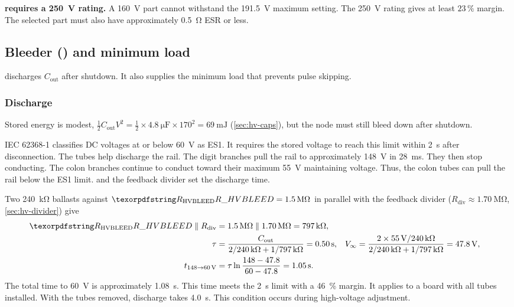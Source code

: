 \textbf{ requires a \SI{250}{\volt} rating.} A
\SI{160}{\volt} part cannot withstand the \SI{191.5}{\volt} maximum setting.
The \SI{250}{\volt} rating gives at least $23\,\%$ margin. The selected part
must also have approximately \SI{0.5}{\ohm} ESR or less.

\subsection{Bleeder () and minimum load}\label{sec:hv-bleeder}

 discharges $C_{\mathrm{out}}$ after shutdown. It also supplies
the minimum load that prevents pulse skipping.

\subsubsection{Discharge}\label{sec:hv-bleeder-discharge}

Stored energy is modest, $\tfrac{1}{2} C_{\mathrm{out}} V^2 =
\tfrac{1}{2}\times\SI{4.8}{\micro\farad}\times 170^2 = \SI{69}{\milli\joule}$
(\cref{sec:hv-caps}), but the node must still bleed down after shutdown.

IEC 62368-1 classifies DC voltages at or below \SI{60}{\volt} as ES1. It
requires the stored voltage to reach this limit within \SI{2}{\second} after
disconnection. The tubes help discharge the rail. The digit branches pull the
rail to approximately \SI{148}{\volt} in \SI{28}{\milli\second}. They then stop
conducting. The colon branches continue to conduct toward their maximum
\SI{55}{\volt} maintaining voltage. Thus, the colon tubes can pull the rail
below the ES1 limit.  and the feedback divider set the discharge
time.

Two \SI{240}{\kilo\ohm} ballasts against $\des{R}{HVBLEED} = \SI{1.5}{\mega\ohm}$
in parallel with the feedback divider ($R_{\mathrm{div}} \approx
\SI{1.70}{\mega\ohm}$, \cref{sec:hv-divider}) give
\begin{align*}
  \des{R}{HVBLEED} \parallel R_{\mathrm{div}} &= 1.5\,\si{\mega\ohm} \parallel
    1.70\,\si{\mega\ohm} = \SI{797}{\kilo\ohm}, \\
  \tau &= \frac{C_{\mathrm{out}}}{2/\SI{240}{\kilo\ohm} + 1/\SI{797}{\kilo\ohm}}
       = \SI{0.50}{\second}, &
  V_\infty &= \frac{2\times\SI{55}{\volt}/\SI{240}{\kilo\ohm}}
                   {2/\SI{240}{\kilo\ohm} + 1/\SI{797}{\kilo\ohm}}
            = \SI{47.8}{\volt},\\
  t_{148\rightarrow 60\,\mathrm{V}} &= \tau
    \ln\frac{148 - 47.8}{60 - 47.8} = \SI{1.05}{\second}.
\end{align*}
The total time to \SI{60}{\volt} is approximately \SI{1.08}{\second}. This time
meets the \SI{2}{\second} limit with a \SI{46}{\percent} margin. It applies to a
board with all tubes installed. With the tubes removed, discharge takes
\SI{4.0}{\second}. This condition occurs during high-voltage adjustment.

